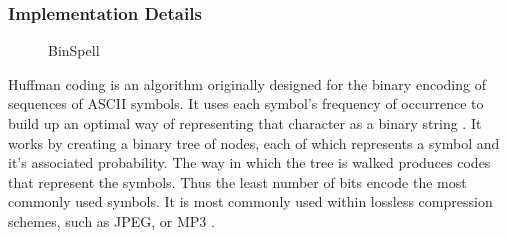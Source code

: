 \documentclass[12pt,titlepage]{article}
\begin{document}
\subsubsection{Implementation Details}

\begin{figure}
\centering
{}
\caption{BinSpell}
\label{fig:Bin}
\end{figure}

Huffman coding is an algorithm originally designed for the binary encoding of sequences of ASCII 
symbols.  It uses each symbol's frequency of occurrence to build up an optimal way of representing that 
character as a binary string \cite{cormen_introduction_2001}.  It works by creating a binary tree of nodes, each of which represents a 
symbol and it's associated probability. The way in which the tree is walked produces codes that 
represent the symbols.  Thus the least number of bits encode the most commonly used symbols.  It is 
most commonly used within lossless compression schemes, such as JPEG, or MP3 \cite{cormen_introduction_2001}.
\end{document}
